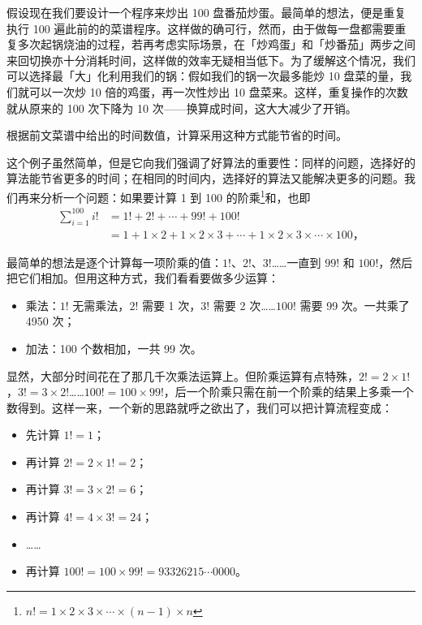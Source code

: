 假设现在我们要设计一个程序来炒出 100 盘番茄炒蛋。最简单的想法，便是重复执行 100 遍此前的的菜谱程序。这样做的确可行，然而，由于做每一盘都需要重复多次起锅烧油的过程，若再考虑实际场景，在「炒鸡蛋」和「炒番茄」两步之间来回切换亦十分消耗时间，这样做的效率无疑相当低下。为了缓解这个情况，我们可以选择最「大」化利用我们的锅：假如我们的锅一次最多能炒 10 盘菜的量，我们就可以一次炒 10 倍的鸡蛋，再一次性炒出 10 盘菜来。这样，重复操作的次数就从原来的 100 次下降为 10 次——换算成时间，这大大减少了开销。

\begin{note}
  根据前文菜谱中给出的时间数值，计算采用这种方式能节省的时间。
\end{note}

这个例子虽然简单，但是它向我们强调了好算法的重要性：同样的问题，选择好的算法能节省更多的时间；在相同的时间内，选择好的算法又能解决更多的问题。我们再来分析一个问题：如果要计算 1 到 100 的阶乘\footnote{$n! = 1\times2\times3\times\cdots\times(n-1)\times n$}和，也即
\begin{align*}
  \sum_{i=1}^{100}i!&=1!+2!+\cdots+99!+100! \\
  &=1+1\times 2+1\times 2\times 3+\cdots+1\times 2\times 3\times\cdots\times 100\text{，}
\end{align*}

最简单的想法是逐个计算每一项阶乘的值：$1!$、$2!$、$3!$……一直到 $99!$ 和 $100!$，然后把它们相加。但用这种方式，我们看看要做多少运算：

\begin{itemize}
  \item 乘法：$1!$ 无需乘法，$2!$ 需要 1 次，$3!$ 需要 2 次……$100!$ 需要 99 次。一共乘了 4950 次；
  \item 加法：100 个数相加，一共 99 次。
\end{itemize}

显然，大部分时间花在了那几千次乘法运算上。但阶乘运算有点特殊，$2! = 2\times 1!$，$3! = 3\times 2!$……$100! = 100\times 99!$，后一个阶乘只需在前一个阶乘的结果上多乘一个数得到。这样一来，一个新的思路就呼之欲出了，我们可以把计算流程变成：

\begin{itemize}
  \item 先计算 $1! = 1$；
  \item 再计算 $2! = 2 \times 1! = 2$；
  \item 再计算 $3! = 3 \times 2! = 6$；
  \item 再计算 $4! = 4 \times 3! = 24$；
  \item ……
  \item 再计算 $100! = 100 \times 99! = 93326215 \cdots 0000$。
\end{itemize}

